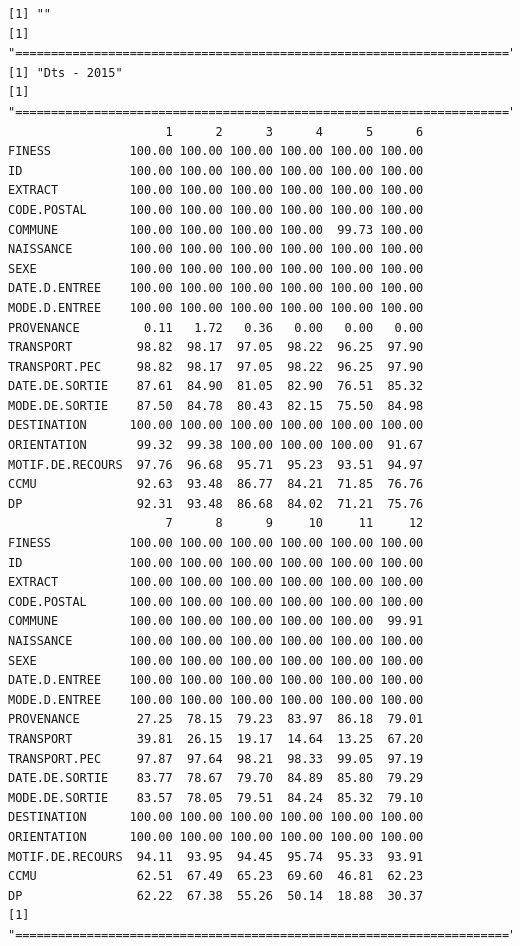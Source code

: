 \documentclass[]{article}
\begin{document}
\begin{verbatim}
[1] ""
[1] "====================================================================="
[1] "Dts - 2015"
[1] "====================================================================="
                      1      2      3      4      5      6
FINESS           100.00 100.00 100.00 100.00 100.00 100.00
ID               100.00 100.00 100.00 100.00 100.00 100.00
EXTRACT          100.00 100.00 100.00 100.00 100.00 100.00
CODE.POSTAL      100.00 100.00 100.00 100.00 100.00 100.00
COMMUNE          100.00 100.00 100.00 100.00  99.73 100.00
NAISSANCE        100.00 100.00 100.00 100.00 100.00 100.00
SEXE             100.00 100.00 100.00 100.00 100.00 100.00
DATE.D.ENTREE    100.00 100.00 100.00 100.00 100.00 100.00
MODE.D.ENTREE    100.00 100.00 100.00 100.00 100.00 100.00
PROVENANCE         0.11   1.72   0.36   0.00   0.00   0.00
TRANSPORT         98.82  98.17  97.05  98.22  96.25  97.90
TRANSPORT.PEC     98.82  98.17  97.05  98.22  96.25  97.90
DATE.DE.SORTIE    87.61  84.90  81.05  82.90  76.51  85.32
MODE.DE.SORTIE    87.50  84.78  80.43  82.15  75.50  84.98
DESTINATION      100.00 100.00 100.00 100.00 100.00 100.00
ORIENTATION       99.32  99.38 100.00 100.00 100.00  91.67
MOTIF.DE.RECOURS  97.76  96.68  95.71  95.23  93.51  94.97
CCMU              92.63  93.48  86.77  84.21  71.85  76.76
DP                92.31  93.48  86.68  84.02  71.21  75.76
                      7      8      9     10     11     12
FINESS           100.00 100.00 100.00 100.00 100.00 100.00
ID               100.00 100.00 100.00 100.00 100.00 100.00
EXTRACT          100.00 100.00 100.00 100.00 100.00 100.00
CODE.POSTAL      100.00 100.00 100.00 100.00 100.00 100.00
COMMUNE          100.00 100.00 100.00 100.00 100.00  99.91
NAISSANCE        100.00 100.00 100.00 100.00 100.00 100.00
SEXE             100.00 100.00 100.00 100.00 100.00 100.00
DATE.D.ENTREE    100.00 100.00 100.00 100.00 100.00 100.00
MODE.D.ENTREE    100.00 100.00 100.00 100.00 100.00 100.00
PROVENANCE        27.25  78.15  79.23  83.97  86.18  79.01
TRANSPORT         39.81  26.15  19.17  14.64  13.25  67.20
TRANSPORT.PEC     97.87  97.64  98.21  98.33  99.05  97.19
DATE.DE.SORTIE    83.77  78.67  79.70  84.89  85.80  79.29
MODE.DE.SORTIE    83.57  78.05  79.51  84.24  85.32  79.10
DESTINATION      100.00 100.00 100.00 100.00 100.00 100.00
ORIENTATION      100.00 100.00 100.00 100.00 100.00 100.00
MOTIF.DE.RECOURS  94.11  93.95  94.45  95.74  95.33  93.91
CCMU              62.51  67.49  65.23  69.60  46.81  62.23
DP                62.22  67.38  55.26  50.14  18.88  30.37
[1] "====================================================================="
\end{verbatim}
\end{document}

